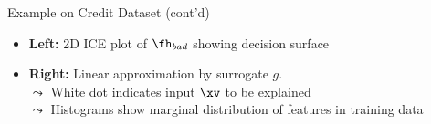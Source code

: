 \documentclass[11pt,compress,t,notes=noshow, aspectratio=169, xcolor=table]{beamer}
\begin{document}
\begin{frame}{Example on Credit Dataset (cont'd)}
\begin{itemize}
    \item \textbf{Left:} 2D ICE plot of \( \fh_{bad} \) showing decision surface
    \item \textbf{Right:} Linear approximation by surrogate \( g \). \\
    $\leadsto$ White dot indicates input \( \xv \) to be explained\\
    $\leadsto$ Histograms show marginal distribution of features in training data %
\end{itemize}

\end{frame}



%
%
%
\end{document}
